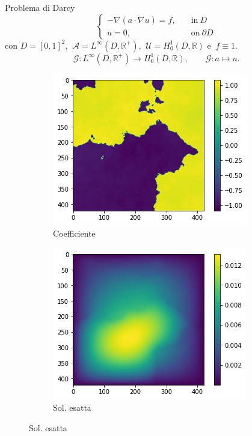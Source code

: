 \documentclass{beamer}
\newcommand{\numberset}{\mathbb}
\newcommand{\R}{\numberset{R}}
\begin{document}
\begin{frame}{Problema di Darcy}
	\[ 	\begin{cases}
		- \nabla(a \cdot \nabla u) = f,\quad &  \mathrm{in}\ D\\
		u = 0, & \mathrm{on} \ \partial D
	\end{cases} \]
	con $ D = [0, 1]^2 $, $\ \mathcal{A} = L^{\infty}(D, \R^+) $, $\ \mathcal{U} = H^1_0(D, \R) $ e $\ f \equiv 1 $.
	\[  \mathcal{G}: L^{\infty}(D, \R^+) \to H^1_0(D, \R), \qquad \mathcal{G}:a \mapsto u. \]
	\begin{figure}
		\centering
		\begin{subfigure}{0.4\textwidth}
			\centering
			\includegraphics[width=\textwidth]{zero-shot-coeff.png}
			\caption{Coefficiente}
		\end{subfigure}
		\hfill
		\begin{subfigure}{0.4\textwidth}
			\centering
			\includegraphics[width=\textwidth]{zero-shot-sol.png}
			\caption{Sol. esatta}
		\end{subfigure}
	\end{figure}
\end{frame}
\end{document}
